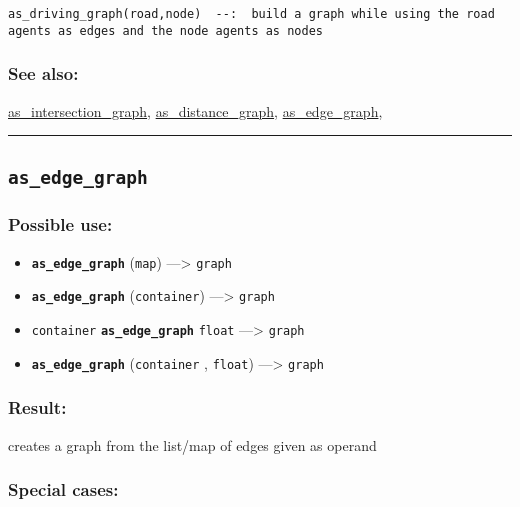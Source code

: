 \documentclass[]{book}
\providecommand{\tightlist}{%
  \setlength{\itemsep}{0pt}\setlength{\parskip}{0pt}}
\theoremstyle{definition}
\theoremstyle{definition}
\theoremstyle{definition}
\theoremstyle{remark}
\begin{document}
\begin{verbatim}
as_driving_graph(road,node)  --:  build a graph while using the road agents as edges and the node agents as nodes 
\end{verbatim}

\subsubsection{See also:}\label{see-also-31}

\href{operators-a-to-a.html\#as_intersection_graph}{as\_intersection\_graph},
\href{operators-a-to-a.html\#as_distance_graph}{as\_distance\_graph},
\href{operators-a-to-a.html\#as_edge_graph}{as\_edge\_graph},

\begin{center}\rule{0.5\linewidth}{\linethickness}\end{center}

\subsection{\texorpdfstring{\texttt{as\_edge\_graph}}{as\_edge\_graph}}\label{as_edge_graph}

\subsubsection{Possible use:}\label{possible-use-47}

\begin{itemize}
\tightlist
\item
  \textbf{\texttt{as\_edge\_graph}} (\texttt{map}) ---\textgreater{}
  \texttt{graph}
\item
  \textbf{\texttt{as\_edge\_graph}} (\texttt{container})
  ---\textgreater{} \texttt{graph}
\item
  \texttt{container} \textbf{\texttt{as\_edge\_graph}} \texttt{float}
  ---\textgreater{} \texttt{graph}
\item
  \textbf{\texttt{as\_edge\_graph}} (\texttt{container} ,
  \texttt{float}) ---\textgreater{} \texttt{graph}
\end{itemize}

\subsubsection{Result:}\label{result-46}

creates a graph from the list/map of edges given as operand

\subsubsection{Special cases:}\label{special-cases-18}
\end{document}
